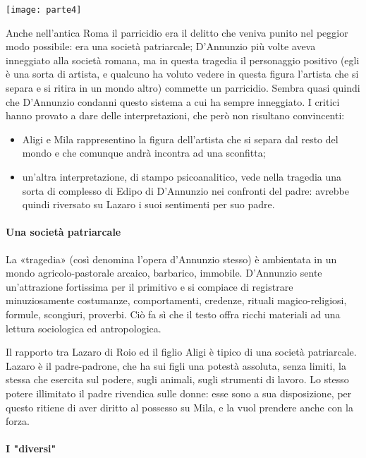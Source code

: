 \documentclass{book}
\begin{document}
\texttt{[image: parte4]}

Anche nell'antica Roma il parricidio era il delitto che veniva punito
nel peggior modo possibile: era una società patriarcale; D'Annunzio più
volte aveva inneggiato alla società romana, ma in questa tragedia il
personaggio positivo (egli è una sorta di artista, e qualcuno ha voluto
vedere in questa figura l'artista che si separa e si ritira in un mondo
altro) commette un parricidio. Sembra quasi quindi che D'Annunzio
condanni questo sistema a cui ha sempre inneggiato. I critici hanno
provato a dare delle interpretazioni, che però non risultano
convincenti:
\begin{itemize}
\item Aligi e Mila rappresentino la figura dell'artista che si
separa dal resto del mondo e che comunque andrà incontra ad una
sconfitta; 
\item un'altra interpretazione, di stampo psicoanalitico, vede
nella tragedia una sorta di complesso di Edipo di D'Annunzio nei
confronti del padre: avrebbe quindi riversato su Lazaro i suoi
sentimenti per suo padre.
\end{itemize}

\paragraph{Una società patriarcale} La «tragedia» (così denomina l'opera d'Annunzio stesso) è ambientata in un mondo agricolo-pastorale arcaico, barbarico, immobile. D'Annunzio sente un'attrazione fortissima per il primitivo e si compiace di registrare minuziosamente costumanze, comportamenti, credenze, rituali magico-religiosi, formule, scongiuri, proverbi. Ciò fa sì che il testo offra ricchi materiali ad una lettura sociologica ed antropologica.

Il rapporto tra Lazaro di Roio ed il figlio Aligi è tipico di una società patriarcale. Lazaro è il padre-padrone, che ha sui figli una potestà assoluta, senza limiti, la stessa che esercita sul podere, sugli animali, sugli strumenti di lavoro. Lo stesso potere illimitato il padre rivendica sulle donne: esse sono a sua disposizione, per questo ritiene di aver diritto al possesso su Mila, e la vuol prendere anche con la forza.

\paragraph{I "diversi"}
\end{document}
